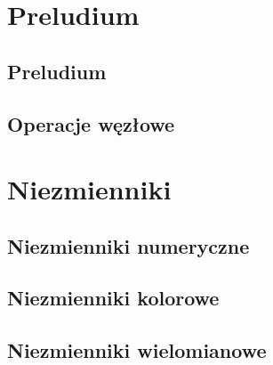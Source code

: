 \documentclass{LegrandOrangeBook}
\begin{document}





\tableofcontents

\pagestyle{fancy} %
\cleardoublepage %

\chapterspaceabove{5.75cm} %
\chapterspacebelow{7.25cm} %

\part{Preludium}
\chapter{Preludium}




\chapter{Operacje węzłowe}



\part{Niezmienniki}
\chapter{Niezmienniki numeryczne}


\chapter{Niezmienniki kolorowe}





\chapter{Niezmienniki wielomianowe}







\end{document}
